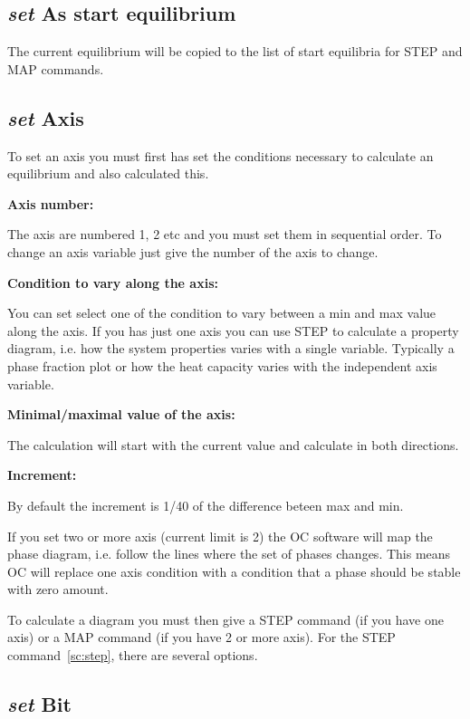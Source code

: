 \documentclass[11pt]{article}
\begin{document}
\subsection{{\em set} As start equilibrium}

The current equilibrium will be copied to the list of start equilibria
for STEP and MAP commands.

\hypertarget{Set axis}{}
\subsection{{\em set} Axis}\label{sc:setaxis}

To set an axis you must first has set the conditions necessary to
calculate an equilibrium and also calculated this.

{\bf Axis number:}

The axis are numbered 1, 2 etc and you must set them in sequential
order.  To change an axis variable just give the number of the axis to
change.

{\bf Condition to vary along the axis:}

You can set select one of the condition to vary between a min and max
value along the axis.  If you has just one axis you can use STEP to
calculate a property diagram, i.e. how the system properties varies
with a single variable.  Typically a phase fraction plot or how the
heat capacity varies with the independent axis variable.

{\bf Minimal/maximal value of the axis:}

The calculation will start with the current value and calculate in
both directions.

{\bf Increment:}

By default the increment is 1/40 of the difference beteen max and min.

If you set two or more axis (current limit is 2) the OC software will
map the phase diagram, i.e. follow the lines where the set of phases
changes.  This means OC will replace one axis condition with a condition
that a phase should be stable with zero amount.

To calculate a diagram you must then give a STEP command (if you have
one axis) or a MAP command (if you have 2 or more axis).  For the STEP
command~\ref{sc:step}, there are several options.

\hypertarget{Set which status}{}
\subsection{{\em set} Bit}
\end{document}
